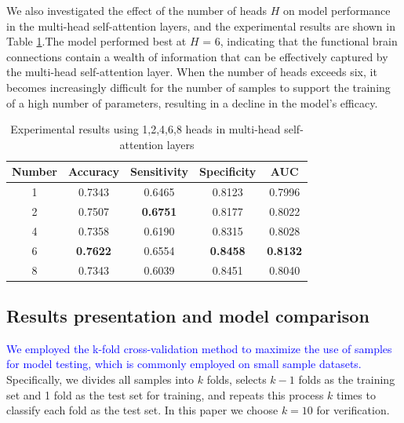 \documentclass[a4paper]{cas-dc}
\begin{document}
We also investigated the effect of the number of heads $H$ on model performance in the multi-head self-attention layers, and the experimental results are shown in Table \ref{Table3}.The model performed best at $H$ = 6, indicating that the functional brain connections contain a wealth of information that can be effectively captured by the multi-head self-attention layer. When the number of heads exceeds six, it becomes increasingly difficult for the number of samples to support the training of a high number of parameters, resulting in a decline in the model's efficacy.
\begin{table}[]
	\caption{Experimental results using 1,2,4,6,8 heads in multi-head self-attention layers}\label{Table3}
	\begin{tabular*}{\tblwidth}{@{}ccccc@{}}
		\toprule
		\textbf{Number}& \textbf{Accuracy} & \textbf{Sensitivity} & \textbf{Specificity} & \textbf{AUC} \\ %
		\midrule
		1                            & 0.7343                & 0.6465                   & 0.8123                   & 0.7996           \\
		2                             & 0.7507                & \textbf{0.6751}          & 0.8177                   & 0.8022           \\
		4                             & 0.7358                & 0.6190                   & 0.8315                   & 0.8028           \\
		6                             & \textbf{0.7622}       & 0.6554                   & \textbf{0.8458}          & \textbf{0.8132}  \\
		8                             & 0.7343                & 0.6039                   & 0.8451                   & 0.8040      \\
		\bottomrule
	\end{tabular*}
\end{table}
\subsection{Results presentation and model comparison}
\textcolor{blue}{We employed the k-fold cross-validation method to maximize the use of samples for model testing, which is commonly employed on small sample datasets.} Specifically, we divides all samples into $k$ folds, selects $k-1$ folds as the training set and 1 fold as the test set for training, and repeats this process $k$ times to classify each fold as the test set. In this paper we choose $k=10$ for verification.
\end{document}
